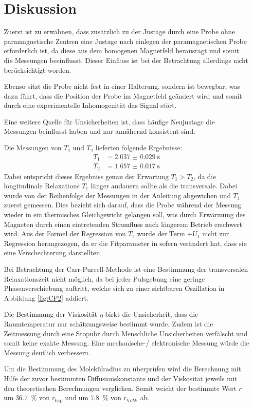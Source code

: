 \section{Diskussion}
\label{sec:Diskussion}

Zuerst ist zu erwähnen, dass zusätzlich zu der Justage durch eine Probe ohne
paramagnetische Zentren eine Justage nach einlegen der paramagnetischen Probe
erforderlich ist, da diese aus dem homogenen Magnetfeld herausragt und somit die
Messungen beeinflusst. Dieser Einfluss ist bei der Betrachtung allerdings nicht
berücksichtigt worden.

Ebenso sitzt die Probe nicht fest in einer Halterung, sondern ist bewegbar, was
dazu führt, dass die Position der Probe im Magnetfeld geändert wird und somit durch
eine experimentelle Inhomogenität das Signal stört.

Eine weitere Quelle für Unsicherheiten ist, dass häufige Neujustage die Messungen
beinflusst haben und nur annähernd konsistent sind.

Die Messungen von $T_1$ und $T_2$ lieferten folgende Ergebnisse:
\begin{align*}
  T_1 &= \SI{2.037(29)}{\second} \\
  T_2 &= \SI{1.657(17)}{\second}
\end{align*}
Dabei entspricht dieses Ergebniss genau der Erwartung $T_1 > T_2$, da die longitudinale
Relaxations $T_1$ länger andauern sollte als die transversale. Dabei wurde von der
Reihenfolge der Messungen in der Anleitung abgewichen und $T_1$ zuerst gemessen.
Dies bezieht sich darauf, dass die Probe während der Messung wieder in ein thermisches
Gleichgewicht gelangen soll, was durch Erwärmung des Magneten durch einen eintretenden
Stromfluss nach längerem Betrieb erschwert wird.
Aus der Formel der Regression von $T_1$ wurde der Term $+ U_1$ nicht zur Regression
herangezogen, da er die Fitparameter in sofern verändert hat, dass sie eine
Verschechterung darstellten.

Bei Betrachtung der Carr-Purcell-Methode ist eine Bestimmung der transversalen
Relaxationszeit nicht möglich, da bei jeder Pulsgebung eine geringe Phasenverschiebung
auftritt, welche sich zu einer sichtbaren Oszillation in Abbildung \ref{fig:CP2}
addiert.

Die Bestimmung der Viskosität $\eta$ birkt die Unsicherheit, dass die Raumtemperatur
nur schätzungsweise bestimmt wurde. Zudem ist die Zeitmessung durch eine Stopuhr durch
Menschliche Unsicherheiten verfälscht und somit keine exakte Messung. Eine mechanische-/
elektronische Messung würde die Messung deutlich verbessern.

Um die Bestimmung des Molekülradius zu überprüfen wird die Berechnung mit Hilfe der zuvor
bestimmten Diffusionskonstante und der Viskosität jeweils mit den theoretischen
Berechnungen verglichen.
Somit weicht der bestimmte Wert $r$ um \SI{36.7}{\percent} von $r_\text{hcp}$ und um
\SI{7.8}{\percent} von $r_\text{VdW}$ ab.
